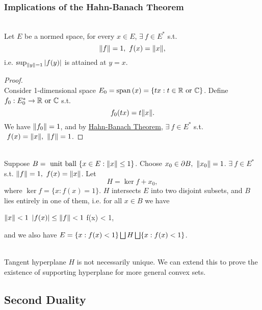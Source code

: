 \subsubsection{Implications of the Hahn-Banach Theorem}
\begin{proposition}\label{SHT}\ \\
Let $E$ be a normed space, for every $x \in E$, $\exists\ f \in E^*$ s.t. 
\begin{equation*}
    \norm{f} = 1,\ f(x) = \norm{x},
\end{equation*}
i.e. $\sup_{\norm{y}=1} \abs{f(y)}$ is attained at $y = x$. 
\end{proposition}
\begin{proof}\ \\
Consider 1-dimensional space $E_0 = \operatorname{span}\left(x\right) = \{tx: t \in \mathbb{R} \text{ or } \mathbb{C}\}$. Define $f_0: E_0^* \to \mathbb{R} \text{ or } \mathbb{C}$ s.t.
\begin{equation*}
    f_0(tx) = t \norm{x}.
\end{equation*}
We have $\norm{f_0} = 1$, and by \hyperref[HB thm]{Hahn-Banach Theorem}, $\exists\ f \in E^*$ s.t. $\ f(x) = \norm{x},\ \norm{f} = 1$.
\end{proof}
\begin{remark}\ \\
Suppose $B = \text{ unit ball } \{x \in E: \norm{x} \leq 1\}$. Choose $x_0 \in \partial B,\ \norm{x_0} = 1$. $\exists\ f \in E^*$ s.t. $\norm{f} = 1,\ f(x) = \norm{x}$. Let 
\begin{equation*}
    H = \ker{f} + x_0,
\end{equation*}
where $\ker{f} = \{x: f(x) = 1\}$. $H$ intersects $E$ into two disjoint subsets, and $B$ lies entirely in one of them, i.e. for all $x \in B$ we have
\begin{center}
    $\norm{x} < 1$ \imply $\abs{f(x)} \leq \norm{f} < 1$ \imply f(x) < 1,
\end{center}
and we also have $E = \{x: f(x) < 1\} \bigsqcup H \bigsqcup \{x: f(x) < 1\}$.
\end{remark}
\begin{remark}\ \\
Tangent hyperplane $H$ is not necessarily unique. We can extend this to prove the existence of supporting hyperplane for more general convex sets.
\end{remark}

\vspace{12pt}
\subsection{Second Duality}

